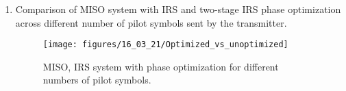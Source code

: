 \documentclass[12pt,a4paper]{article}
\begin{document}
\begin{enumerate}
\item 
Comparison of MISO system with IRS and two-stage IRS phase optimization across different number of pilot symbols sent by the transmitter. 
	\begin{figure}[H]
	\texttt{[image: figures/16\_03\_21/Optimized\_vs\_unoptimized]}
	  \caption{MISO, IRS system with phase optimization for different numbers of pilot symbols.}
	  \label{AED}
	\end{figure}		

\end{enumerate}
\end{document}
